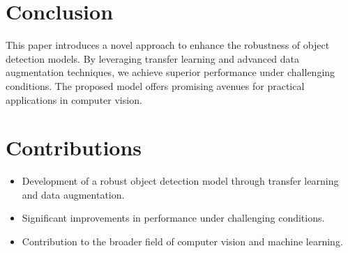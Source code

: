 \documentclass{article}
\begin{document}
\section{Conclusion}
This paper introduces a novel approach to enhance the robustness of object detection models. By leveraging transfer learning and advanced data augmentation techniques, we achieve superior performance under challenging conditions. The proposed model offers promising avenues for practical applications in computer vision.

\section{Contributions}
\begin{itemize}
    \item Development of a robust object detection model through transfer learning and data augmentation.
    \item Significant improvements in performance under challenging conditions.
    \item Contribution to the broader field of computer vision and machine learning.
\end{itemize}
\end{document}
